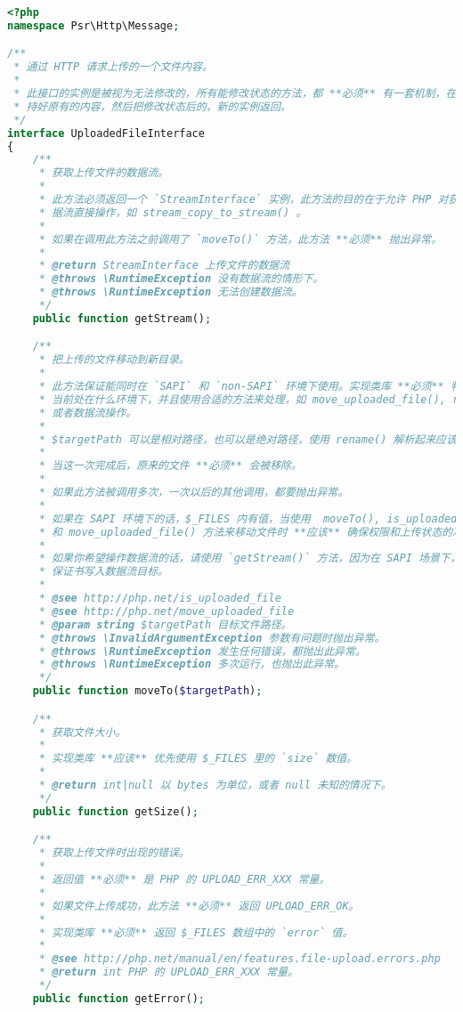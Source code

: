 \begin{lstlisting}[language=PHP]
<?php
namespace Psr\Http\Message;

/**
 * 通过 HTTP 请求上传的一个文件内容。
 *
 * 此接口的实例是被视为无法修改的，所有能修改状态的方法，都 **必须** 有一套机制，在内部保
 * 持好原有的内容，然后把修改状态后的，新的实例返回。
 */
interface UploadedFileInterface
{
    /**
     * 获取上传文件的数据流。
     *
     * 此方法必须返回一个 `StreamInterface` 实例，此方法的目的在于允许 PHP 对获取到的数
     * 据流直接操作，如 stream_copy_to_stream() 。
     *
     * 如果在调用此方法之前调用了 `moveTo()` 方法，此方法 **必须** 抛出异常。
     *
     * @return StreamInterface 上传文件的数据流
     * @throws \RuntimeException 没有数据流的情形下。
     * @throws \RuntimeException 无法创建数据流。
     */
    public function getStream();

    /**
     * 把上传的文件移动到新目录。
     *
     * 此方法保证能同时在 `SAPI` 和 `non-SAPI` 环境下使用。实现类库 **必须** 判断
     * 当前处在什么环境下，并且使用合适的方法来处理，如 move_uploaded_file(), rename()
     * 或者数据流操作。
     *
     * $targetPath 可以是相对路径，也可以是绝对路径，使用 rename() 解析起来应该是一样的。
     *
     * 当这一次完成后，原来的文件 **必须** 会被移除。
     * 
     * 如果此方法被调用多次，一次以后的其他调用，都要抛出异常。
     *
     * 如果在 SAPI 环境下的话，$_FILES 内有值，当使用  moveTo(), is_uploaded_file()
     * 和 move_uploaded_file() 方法来移动文件时 **应该** 确保权限和上传状态的准确性。
     * 
     * 如果你希望操作数据流的话，请使用 `getStream()` 方法，因为在 SAPI 场景下，无法
     * 保证书写入数据流目标。
     * 
     * @see http://php.net/is_uploaded_file
     * @see http://php.net/move_uploaded_file
     * @param string $targetPath 目标文件路径。
     * @throws \InvalidArgumentException 参数有问题时抛出异常。
     * @throws \RuntimeException 发生任何错误，都抛出此异常。
     * @throws \RuntimeException 多次运行，也抛出此异常。
     */
    public function moveTo($targetPath);

    /**
     * 获取文件大小。
     *
     * 实现类库 **应该** 优先使用 $_FILES 里的 `size` 数值。
     * 
     * @return int|null 以 bytes 为单位，或者 null 未知的情况下。
     */
    public function getSize();

    /**
     * 获取上传文件时出现的错误。
     *
     * 返回值 **必须** 是 PHP 的 UPLOAD_ERR_XXX 常量。
     *
     * 如果文件上传成功，此方法 **必须** 返回 UPLOAD_ERR_OK。
     *
     * 实现类库 **必须** 返回 $_FILES 数组中的 `error` 值。
     * 
     * @see http://php.net/manual/en/features.file-upload.errors.php
     * @return int PHP 的 UPLOAD_ERR_XXX 常量。
     */
    public function getError();


\end{lstlisting}
